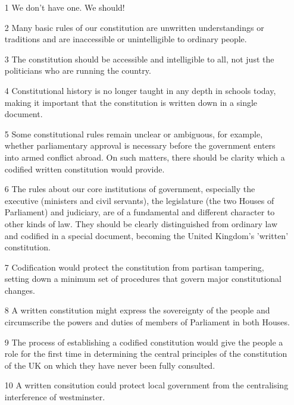 \documentclass[14pt,titlepage]{extarticle}
\begin{document}
\begin{itemize}
  
\item[1]
  We don't have one. We should!

\item[2]
  Many basic rules of our constitution are unwritten understandings or traditions and are inaccessible or unintelligible to ordinary people.

\item[3]
  The constitution should be accessible and intelligible to all, not just the politicians who
are running the country.

\item[4]
  Constitutional history is no longer taught in any depth in schools today, making it important that the constitution is written down in a single document.

\item[5]
  Some constitutional rules remain unclear or ambiguous, for example, whether parliamentary approval is necessary before the government enters into armed conflict abroad.
On such matters, there should be clarity which a codified written constitution would provide.

\item[6]
  The rules about our core institutions of government, especially the
executive (ministers and civil servants), the legislature (the two Houses of
Parliament) and judiciary, are of a fundamental and different character to other
kinds of law. They should be clearly distinguished from ordinary law and codified
in a special document, becoming the United Kingdom's 'written' constitution.

\item[7]
  Codification would protect the constitution from partisan tampering, setting down a minimum set of procedures that govern major constitutional changes.

\item[8]
  A written constitution might express the sovereignty of the people
and circumscribe the powers and duties of members of Parliament in both
Houses.

\item[9]
  The process of establishing a codified constitution would give the people a
role for the first time in determining the central principles of the constitution of
the UK on which they have never been fully consulted.

\item[10]
  A written consitution could protect local government from the centralising interference of westminster.


\end{itemize}
\end{document}
